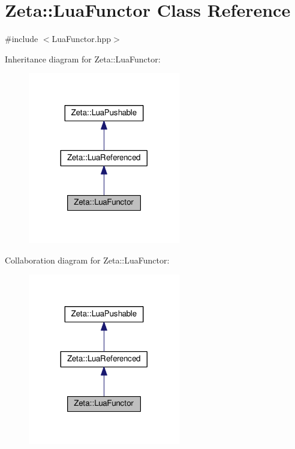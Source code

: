 \hypertarget{classZeta_1_1LuaFunctor}{\section{Zeta\+:\+:Lua\+Functor Class Reference}
\label{classZeta_1_1LuaFunctor}
}


{\ttfamily \#include $<$Lua\+Functor.\+hpp$>$}



Inheritance diagram for Zeta\+:\+:Lua\+Functor\+:\nopagebreak
\begin{figure}[H]
\begin{center}
\leavevmode
\includegraphics[width=188pt]{classZeta_1_1LuaFunctor__inherit__graph}
\end{center}
\end{figure}


Collaboration diagram for Zeta\+:\+:Lua\+Functor\+:\nopagebreak
\begin{figure}[H]
\begin{center}
\leavevmode
\includegraphics[width=188pt]{classZeta_1_1LuaFunctor__coll__graph}
\end{center}
\end{figure}
